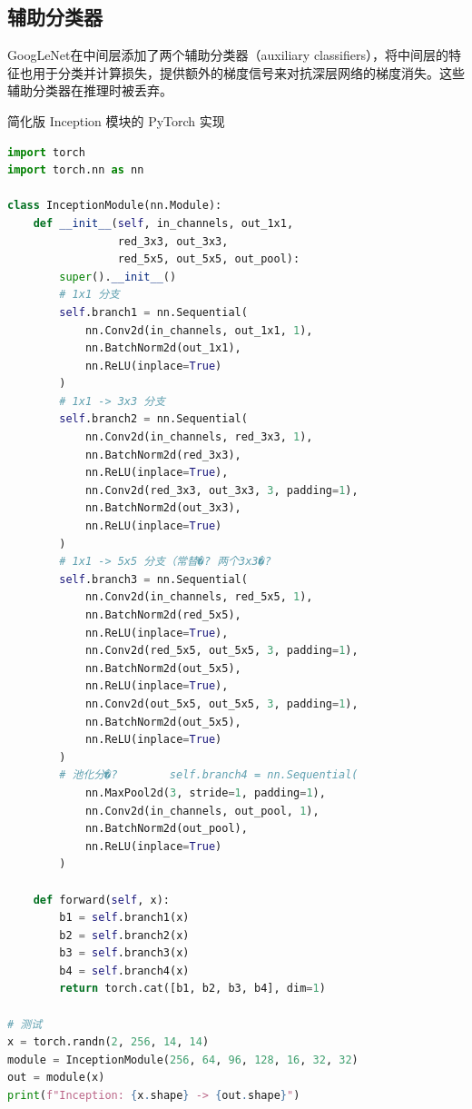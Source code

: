\subsection{辅助分类器}

GoogLeNet在中间层添加了两个辅助分类器（auxiliary classifiers），将中间层的特征也用于分类并计算损失，提供额外的梯度信号来对抗深层网络的梯度消失。这些辅助分类器在推理时被丢弃。

\begin{mycode}{简化版 Inception 模块的 PyTorch 实现}
\begin{lstlisting}[language=Python]
import torch
import torch.nn as nn

class InceptionModule(nn.Module):
    def __init__(self, in_channels, out_1x1,
                 red_3x3, out_3x3,
                 red_5x5, out_5x5, out_pool):
        super().__init__()
        # 1x1 分支
        self.branch1 = nn.Sequential(
            nn.Conv2d(in_channels, out_1x1, 1),
            nn.BatchNorm2d(out_1x1),
            nn.ReLU(inplace=True)
        )
        # 1x1 -> 3x3 分支
        self.branch2 = nn.Sequential(
            nn.Conv2d(in_channels, red_3x3, 1),
            nn.BatchNorm2d(red_3x3),
            nn.ReLU(inplace=True),
            nn.Conv2d(red_3x3, out_3x3, 3, padding=1),
            nn.BatchNorm2d(out_3x3),
            nn.ReLU(inplace=True)
        )
        # 1x1 -> 5x5 分支（常替�? 两个3x3�?
        self.branch3 = nn.Sequential(
            nn.Conv2d(in_channels, red_5x5, 1),
            nn.BatchNorm2d(red_5x5),
            nn.ReLU(inplace=True),
            nn.Conv2d(red_5x5, out_5x5, 3, padding=1),
            nn.BatchNorm2d(out_5x5),
            nn.ReLU(inplace=True),
            nn.Conv2d(out_5x5, out_5x5, 3, padding=1),
            nn.BatchNorm2d(out_5x5),
            nn.ReLU(inplace=True)
        )
        # 池化分�?        self.branch4 = nn.Sequential(
            nn.MaxPool2d(3, stride=1, padding=1),
            nn.Conv2d(in_channels, out_pool, 1),
            nn.BatchNorm2d(out_pool),
            nn.ReLU(inplace=True)
        )

    def forward(self, x):
        b1 = self.branch1(x)
        b2 = self.branch2(x)
        b3 = self.branch3(x)
        b4 = self.branch4(x)
        return torch.cat([b1, b2, b3, b4], dim=1)

# 测试
x = torch.randn(2, 256, 14, 14)
module = InceptionModule(256, 64, 96, 128, 16, 32, 32)
out = module(x)
print(f"Inception: {x.shape} -> {out.shape}")
\end{lstlisting}
\end{mycode}

